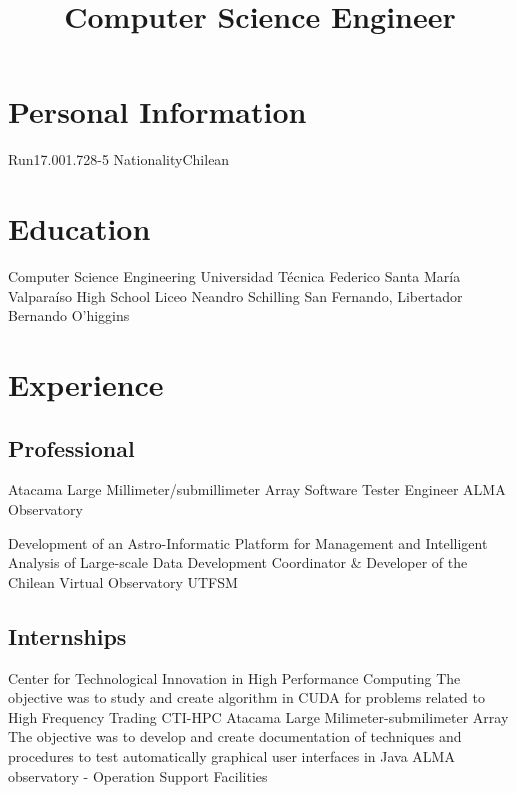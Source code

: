 \documentclass[11pt,a4paper]{moderncv}
\title{Computer Science Engineer}
\begin{document}
\maketitle

\section{Personal Information}
		{Run}{17.001.728-5}
						{Nationality}{Chilean}
							{}{}

\section{Education}
	{Computer Science Engineering}
	{Universidad Técnica Federico Santa María}
	{Valparaíso}
	{}
	{}
	{High School}
	{Liceo Neandro Schilling}
	{San Fernando, Libertador Bernando O'higgins}
	{}{}
\vspace{0.5cm}

\section{Experience}
\subsection{Professional}
	{Atacama Large Millimeter/submillimeter Array}
	{Software Tester Engineer}
	{ALMA Observatory}
	{}{}

	{Development of an Astro-Informatic Platform for Management and Intelligent Analysis of Large-scale Data}
	{Development Coordinator \& Developer of the Chilean Virtual Observatory}
	{UTFSM}
	{}{}

\subsection{Internships}
	{Center for Technological Innovation in High Performance Computing}
	{The objective was to study and create algorithm in CUDA for problems related to High Frequency Trading}
	{CTI-HPC}
	{}{}
	{Atacama Large Milimeter-submilimeter Array}
	{The objective was to develop and create documentation of techniques and
	procedures to test automatically graphical user interfaces in Java}
	{ALMA observatory - Operation Support Facilities}
	{}{}
\end{document}
